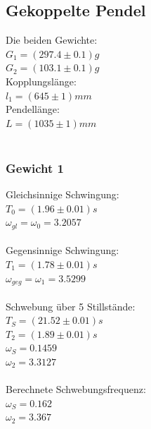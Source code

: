 \documentclass{article}
\begin{document}
\subsection{Gekoppelte Pendel}

Die beiden Gewichte:\\
$G_1=(297.4 \pm 0.1)\si{g}$\\
$G_2=(103.1 \pm 0.1)\si{g}$\\
Kopplungslänge:\\
$l_1=(645 \pm 1)\si{mm}$\\
Pendellänge:\\
$L=(1035 \pm 1)\si{mm}$\\
\\
\subsubsection{Gewicht 1}
Gleichsinnige Schwingung:\\
$T_0=(1.96 \pm 0.01)\si{s}$\\
$\omega_{gl}=\omega_0=3.2057$\\
\\
Gegensinnige Schwingung:\\
$T_1=(1.78 \pm 0.01)\si{s}$\\
$\omega_{geg}=\omega_1=3.5299$\\
\\
Schwebung über 5 Stillstände:\\
$T_S=(21.52 \pm 0.01)\si{s}$\\
$T_2=(1.89 \pm 0.01)\si{s}$\\
$\omega_S=0.1459$\\
$\omega_2=3.3127$\\
\\
Berechnete Schwebungsfrequenz:\\
$\omega_S=0.162$\\
$\omega_2=3.367$\\
\\
\end{document}
